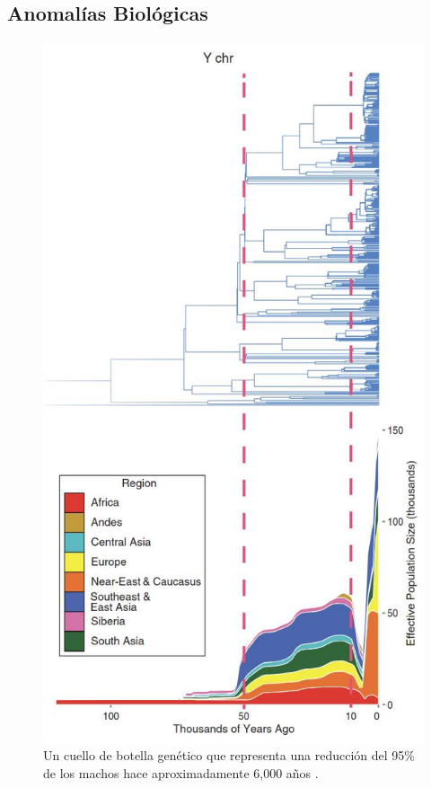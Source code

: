 \documentclass[10pt,twocolumn,letterpaper]{article}
\begin{document}
\subsection{Anomalías Biológicas}
\begin{figure}[b]
\begin{center}
   \includegraphics[width=1\linewidth]{bottleneck.jpg}
\end{center}
   \caption{Un cuello de botella genético que representa una reducción del 95\% de los machos hace aproximadamente 6,000 años \cite{62}.}
\label{fig:10}
\label{fig:onecol}
\end{figure}
\end{document}
